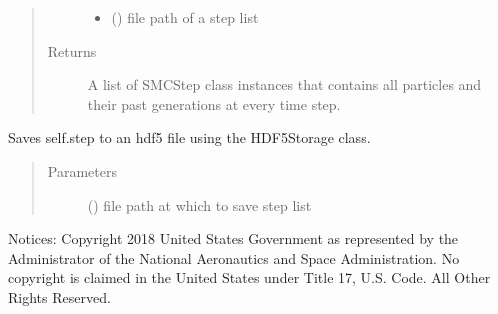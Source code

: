 \documentclass[letterpaper,10pt,english]{sphinxmanual}
\begin{document}
\begin{fulllineitems}
\begin{fulllineitems}
\begin{quote}
\begin{description}
\begin{itemize}
\item {} 
 () \textendash{} file path of a step list

\end{itemize}

\item[{Returns}] \leavevmode
A list of SMCStep class instances that contains all particles
and their past generations at every time step.

\end{description}\end{quote}

\end{fulllineitems}


\begin{fulllineitems}
\label{\detokenize{source_code:smcpy.smc.smc_sampler.SMCSampler.save_step_list}}
Saves self.step to an hdf5 file using the HDF5Storage class.
\begin{quote}\begin{description}
\item[{Parameters}] \leavevmode
{} () \textendash{} file path at which to save step list

\end{description}\end{quote}

\end{fulllineitems}


\end{fulllineitems}

\label{\detokenize{source_code:module-smcpy.smc.smc_step}}
Notices:
Copyright 2018 United States Government as represented by the Administrator of
the National Aeronautics and Space Administration. No copyright is claimed in
the United States under Title 17, U.S. Code. All Other Rights Reserved.
\end{document}
